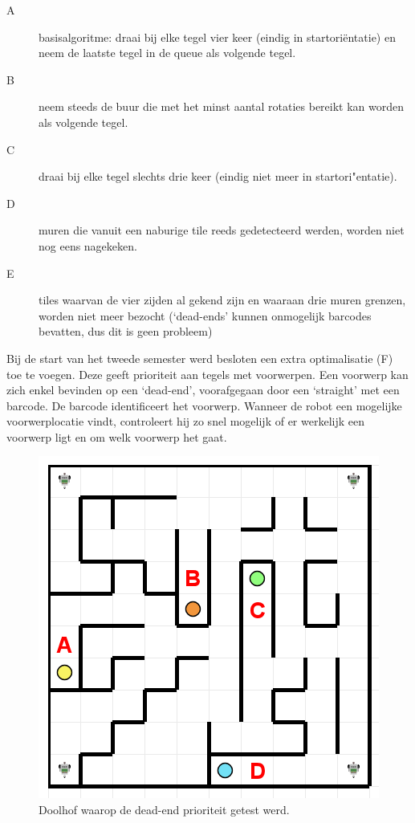 \documentclass[tt2]{penoverslag}
\begin{document}
\begin{description}
\item[A] basisalgoritme: draai bij elke tegel vier keer (eindig in startori\"entatie) en neem de laatste tegel in de queue als volgende tegel.
\item[B] neem steeds de buur die met het minst aantal rotaties bereikt kan worden als volgende tegel.
\item[C] draai bij elke tegel slechts drie keer (eindig niet meer in startori"entatie).
\item[D] muren die vanuit een naburige tile reeds gedetecteerd werden, worden niet nog eens nagekeken.
\item[E] tiles waarvan de vier zijden al gekend zijn en waaraan drie muren grenzen, worden niet meer bezocht (`dead-ends' kunnen onmogelijk barcodes bevatten, dus dit is geen probleem)
\end{description}

Bij de start van het tweede semester werd besloten een extra optimalisatie (F) toe te voegen. Deze geeft prioriteit aan tegels met voorwerpen. Een voorwerp kan zich enkel bevinden op een `dead-end', voorafgegaan door een `straight' met een barcode. De barcode identificeert het voorwerp. Wanneer de robot een mogelijke voorwerplocatie vindt, controleert hij zo snel mogelijk of er werkelijk een voorwerp ligt en om welk voorwerp het gaat. \\

\begin{figure}[!hb]
\centering
	\includegraphics[scale=0.5]{doolhof3}
	\caption{Doolhof waarop de dead-end prioriteit getest werd.}
\label{fig:TestF}
\end{figure}
\end{document}
